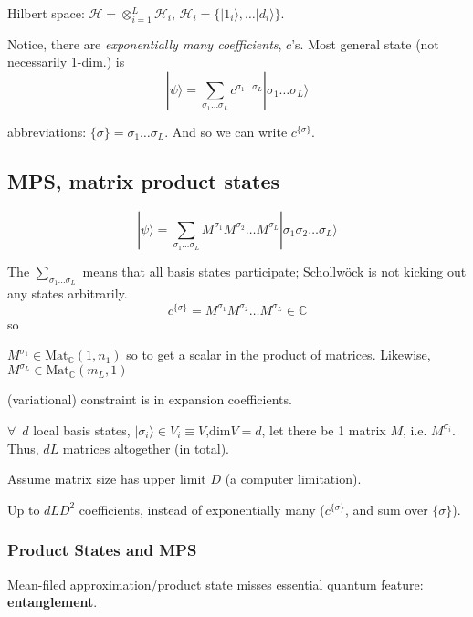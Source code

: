 \documentclass[10pt]{amsart}
\begin{document}
\begin{multicols*}{2}
Hilbert space: $\mathcal{H} = \otimes_{i=1}^L \mathcal{H}_i$, $\mathcal{H}_i = \lbrace | 1_i \rangle , \dots | d_i \rangle \rbrace$. 

Notice, there are \emph{exponentially many coefficients}, $c$'s. Most general state (not necessarily 1-dim.) is 
\begin{equation}
|\psi \rangle = \sum_{\sigma_1 \dots \sigma_L} c^{\sigma_1 \dots \sigma_L} | \sigma_1 \dots \sigma_L \rangle
\end{equation}

abbreviations: $\lbrace \sigma \rbrace = \sigma_1 \dots \sigma_L$. And so we can write $c^{\lbrace \sigma \rbrace}$. 

\subsection{MPS, matrix product states}

\begin{equation}
| \psi \rangle = \sum_{\sigma_1 \dots \sigma_L} M^{\sigma_1} M^{\sigma_2} \dots M^{\sigma_L} | \sigma_1 \sigma_2 \dots \sigma_L \rangle
\end{equation}

The $\sum_{\sigma_1 \dots \sigma_L}$ means that all basis states participate; Schollw\"{o}ck is not kicking out any states arbitrarily. 
\[
c^{\lbrace \sigma \rbrace} = M^{\sigma_1} M^{\sigma_2} \dots M^{\sigma_L} \in \mathbb{C}
\] so

$M^{\sigma_1} \in \text{Mat}_{\mathbb{C}}(1, n_1)$ so to get a scalar in the product of matrices. Likewise, $M^{\sigma_L} \in \text{Mat}_{\mathbb{C}}(m_L, 1)$

(variational) constraint is in expansion coefficients. 

$\forall \, $ $d$ local basis states, $|\sigma_i \rangle \in V_i \equiv V$,$\text{dim}V = d$, let there be 1 matrix $M$, i.e. $M^{\sigma_i}$.  \\
Thus, $dL$ matrices altogether (in total).

Assume matrix size has upper limit $D$ (a computer limitation).

Up to $dLD^2$ coefficients, instead of exponentially many ($c^{\lbrace \sigma \rbrace}$, and sum over $\lbrace \sigma \rbrace$). 

\subsubsection{Product States and MPS}

Mean-filed approximation/product state misses essential quantum feature: \textbf{entanglement}. 


\end{multicols*}
\end{document}
